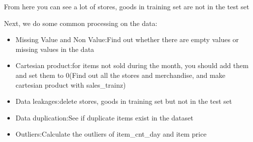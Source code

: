 \documentclass{amsart}
\begin{document}
  From here you can see a lot of stores, goods in training set are not in the test set\par
  Next, we do some common processing on the data:\par
  \begin{itemize}
      \item Missing Value and Non Value:Find out whether there are empty values or missing values in the data
      \item Cartesian product:for items not sold during the month, you should add them and set them to 0(Find out all the stores and merchandise, and make cartesian product with sales_trainz)
      \item Data leakages:delete stores, goods in training set but not in the test set
      \item Data duplication:See if duplicate items exist in the dataset
      \item Outliers:Calculate the outliers of item_cnt_day and item price
  \end{itemize}
\end{document}
